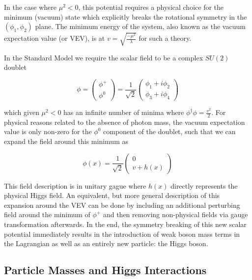 In the case where $\mu^2 < 0$, this potential requires a physical choice for the minimum (vacuum) state which 
explicitly breaks the rotational symmetry in the $(\phi_1, \phi_2)$ plane. The minimum energy of the system, also 
known as the vacuum expectation value (or VEV), is at $v = \sqrt{\frac{-\mu^2}{\lambda}}$ for such a theory. \par

In the Standard Model we require the scalar field to be a complex $SU(2)$ doublet

\begin{equation}
\phi = 
\begin{pmatrix} \phi^+  \\ \phi^0 \end{pmatrix}
= \frac{1}{\sqrt{2}}
\begin{pmatrix} \phi_1 + i\phi_2 \\ \phi_3 + i\phi_4 \end{pmatrix}
\end{equation}

which given $\mu^2 < 0$ has an infinite number of minima where $\phi^\dagger\phi = \frac{v^2}{2}$. For physical 
reasons related to the absence of photon mass, the vacuum expectation value is only non-zero for the $\phi^0$ 
component of the doublet, such that we can expand the field around this minimum as

\begin{equation}
\phi(x) = \frac{1}{\sqrt{2}}
\begin{pmatrix} 0 \\ v + h(x) \end{pmatrix}
\end{equation}

This field description is in unitary gague where $h(x)$ directly represents the physical Higgs field. An equivalent, 
but more general description of this expansion around the VEV can be done by including an additional perturbing 
field around the minimum of $\phi^+$ and then removing non-physical fields via gauge transformation afterwards. 
In the end, the symmetry breaking of this new scalar potential immediately results in the introduction of weak
boson mass terms in the Lagrangian as well as an entirely new particle: the Higgs boson.

\subsection{Particle Masses and Higgs Interactions}

